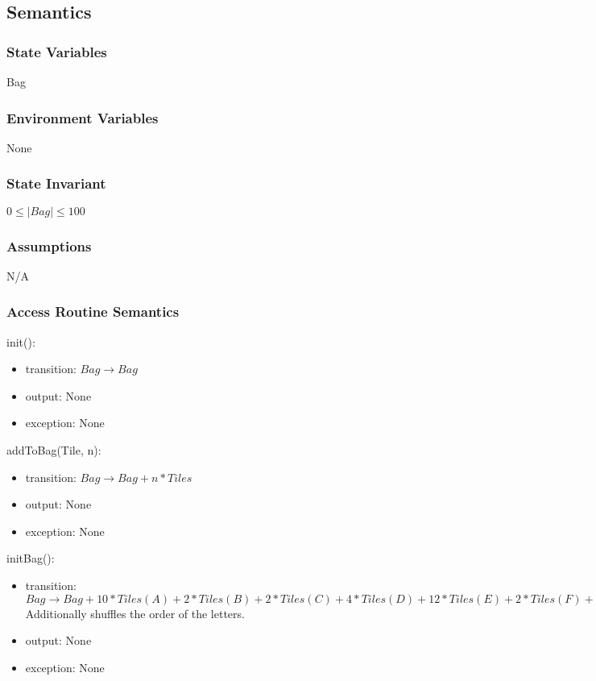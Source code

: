 \documentclass[12pt]{article}
\begin{document}
\subsection* {Semantics}

\subsubsection* {State Variables}

Bag \\

\subsubsection* {Environment Variables}
None
\subsubsection* {State Invariant}

$0 \leq |Bag| \leq 100$

\subsubsection* {Assumptions}

N/A

\begin{itemize}

\end{itemize}

\subsubsection* {Access Routine Semantics}

\noindent init():
\begin{itemize}
\item transition: $Bag \rightarrow Bag$
\item output: None
\item exception: None
\end{itemize}

\noindent addToBag(Tile, n):
\begin{itemize}
\item transition: $Bag \rightarrow Bag+n*Tiles$
\item output: None
\item exception: None
\end{itemize}

\noindent initBag():
\begin{itemize}
\item transition: $Bag \rightarrow Bag + 10*Tiles(A)+2*Tiles(B)+2*Tiles(C)+4*Tiles(D)+12*Tiles(E)+2*Tiles(F)+3*Tiles(G)+2*Tiles(H)+9*Tiles(I)+1*Tiles(J)+1*Tiles(K)+4*Tiles(L)+2*Tiles(M)+6*Tiles(N)+8*Tiles(O)+2*Tiles(P)+1*Tiles(Q)+6*Tiles(R)+5*Tiles(S)+6*Tiles(T)+4*Tiles(U)+2*Tiles(V)+2*Tiles(W)+1*Tiles(X)+2*Tiles(Y)+1*Tiles(Z)$\\
Additionally shuffles the order of the letters.
\item output: None
\item exception: None
\end{itemize}
\end{document}
